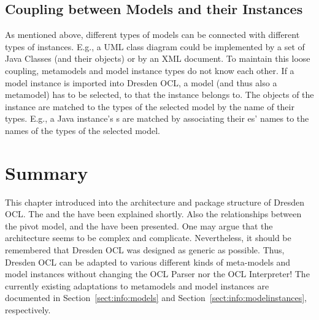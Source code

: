\subsection{Coupling between Models and their Instances}

As mentioned above, different types of models can be connected with different 
types of instances. E.g., a UML class diagram could be implemented by a 
set of Java Classes (and their objects) or by an XML document. To 
maintain this loose coupling, metamodels and model instance types do not 
know each other. If a model instance is imported into Dresden OCL, a model (and
thus also a metamodel) has to be selected, to that the instance belongs to. The
objects of the instance are matched to the types of the selected model by the 
name of their types. E.g., a Java instance's s are matched by
associating their es' names to the names of the types of the
selected model.



\section{Summary}

This chapter introduced into the architecture and package structure of Dresden
OCL. The  and the  have been
explained shortly. Also the relationships between the pivot model,
 and the  have been
presented. One may argue that the architecture seems to be complex and
complicate. Nevertheless, it should be remembered that Dresden OCL was designed
as generic as possible. Thus, Dresden OCL can be adapted to various different
kinds of meta-models and model instances without changing the OCL Parser nor
the OCL Interpreter! The currently existing adaptations to metamodels and model
instances are documented in Section~\ref{sect:info:models} and
Section~\ref{sect:info:modelinstances}, respectively.
